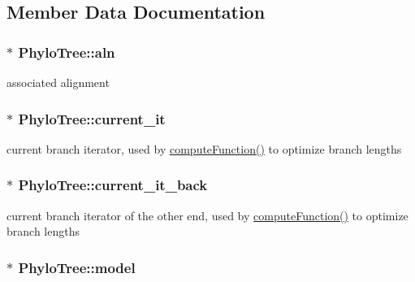 \subsection{Member Data Documentation}
\hypertarget{classPhyloTree_a155032795a2a06262959ecba6fa1761b}{
\subsubsection[{aln}]{$\ast$ {\bf PhyloTree::aln}}}
\label{classPhyloTree_a155032795a2a06262959ecba6fa1761b}
associated alignment \hypertarget{classPhyloTree_a9a11206ad156f382ee0db5f92dd399ce}{
\subsubsection[{current\_\-it}]{$\ast$ {\bf PhyloTree::current\_\-it}}}
\label{classPhyloTree_a9a11206ad156f382ee0db5f92dd399ce}
current branch iterator, used by \hyperlink{classPhyloTree_a34c7bdc00d48d66e1a8ebfee9af1f100}{computeFunction()} to optimize branch lengths \hypertarget{classPhyloTree_a5016a4372500fe919bfa09b713cd2344}{
\subsubsection[{current\_\-it\_\-back}]{$\ast$ {\bf PhyloTree::current\_\-it\_\-back}}}
\label{classPhyloTree_a5016a4372500fe919bfa09b713cd2344}
current branch iterator of the other end, used by \hyperlink{classPhyloTree_a34c7bdc00d48d66e1a8ebfee9af1f100}{computeFunction()} to optimize branch lengths \hypertarget{classPhyloTree_affd265bc9cd055d0f59bfda46c98387b}{
\subsubsection[{model}]{$\ast$ {\bf PhyloTree::model}}}
